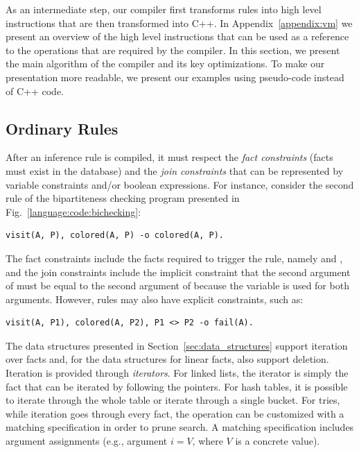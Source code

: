 As an intermediate step, our compiler first transforms rules into high level
instructions that are then transformed into C++. In Appendix~\ref{appendix:vm}
we present an overview of the high level instructions that can be used as a
reference to the operations that are required by the compiler. In this section,
we present the main algorithm of the compiler and its key optimizations. To make
our presentation more readable, we present our examples using pseudo-code
instead of C++ code.

\subsection{Ordinary Rules}\label{sec:compile}

After an inference rule is compiled, it must respect the \emph{fact constraints}
(facts must exist in the database) and the \emph{join constraints} that can be
represented by variable constraints and/or boolean expressions. For instance,
consider the second rule of the bipartiteness checking program presented in
Fig.~\ref{language:code:bichecking}:

\begin{Verbatim}[fontsize=\codesize]
visit(A, P), colored(A, P) -o colored(A, P).
\end{Verbatim}

The fact constraints include the facts required to trigger the rule, namely
 and , and the join constraints include
the implicit constraint that the second argument of  must be equal
to the second argument of  because the variable  is used
for both arguments. However, rules may also have explicit constraints, such as:

\begin{Verbatim}[fontsize=\codesize]
visit(A, P1), colored(A, P2), P1 <> P2 -o fail(A).
\end{Verbatim}

The data structures presented in Section~\ref{sec:data_structures} support
iteration over facts and, for the data structures for linear facts, also support
deletion. Iteration is provided through \emph{iterators}. For linked lists, the
iterator is simply the fact that can be iterated by following the 
pointers. For hash tables, it is possible to iterate through the whole table or
iterate through a single bucket. For tries, while iteration goes through every
fact, the operation can be customized with a matching specification in order to
prune search. A matching specification includes argument assignments (e.g.,
argument $i = V$, where $V$ is a concrete value).

